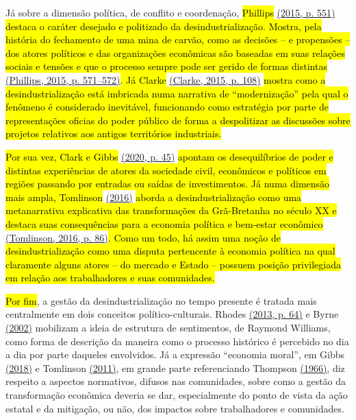 Já sobre a dimensão política, de conflito e coordenação, \hl{Phillips}
\href{https://www.zotero.org/google-docs/?7iYBD0}{(2015, p. 551)}
\hl{destaca o caráter desejado e politizado da desindustrialização.
Mostra, pela história do fechamento de uma mina de carvão, como as
decisões -- e propensões -- dos atores políticos e das organizações
econômicas são baseadas em suas relações sociais e tensões e que o
processo sempre pode ser gerido de formas distintas}
\href{https://www.zotero.org/google-docs/?T6n73h}{(Phillips, 2015, p.
571--572)}\hl{. Já Clarke}
\href{https://www.zotero.org/google-docs/?YgWzzI}{(Clarke, 2015, p.
108)} \hl{mostra como a desindustrialização está imbricada numa
narrativa de ``modernização'' pela qual o fenômeno é considerado
inevitável, funcionando como estratégia por parte de representações
oficias do poder público de forma a despolitizar as discussões sobre
projetos relativos aos antigos territórios industriais.}

\hl{Por sua vez, Clark e Gibbs}
\href{https://www.zotero.org/google-docs/?QpVkIs}{(2020, p. 45)}
\hl{apontam os desequilíbrios de poder e distintas experiências de
atores da sociedade civil, econômicos e políticos em regiões passando
por entradas ou saídas de investimentos. Já numa dimensão mais ampla,
Tomlinson} \href{https://www.zotero.org/google-docs/?FkA0zT}{(2016)}
\hl{aborda a desindustrialização como uma metanarrativa explicativa das
transformações da Grã-Bretanha no século XX e destaca suas consequências
para a economia política e bem-estar econômico}
\href{https://www.zotero.org/google-docs/?80xC3Z}{(Tomlinson, 2016, p.
86)}\hl{. Como um todo, há assim uma noção de desindustrialização como
uma disputa pertencente à economia política na qual claramente alguns
atores -- do mercado e Estado -- possuem posição privilegiada em relação
aos trabalhadores e suas comunidades.}

\hl{Por fim}, a gestão da desindustrialização no tempo presente é
tratada mais centralmente em dois conceitos político-culturais. Rhodes
\href{https://www.zotero.org/google-docs/?dYyfpM}{(2013, p. 64)} e Byrne
\href{https://www.zotero.org/google-docs/?izvyTn}{(2002)} mobilizam a
ideia de estrutura de sentimentos, de Raymond Williams, como forma de
descrição da maneira como o processo histórico é percebido no dia a dia
por parte daqueles envolvidos. Já a expressão ``economia moral'', em
Gibbs \href{https://www.zotero.org/google-docs/?7BP6gP}{(2018)} e
Tomlinson \href{https://www.zotero.org/google-docs/?ULOwso}{(2011)}, em
grande parte referenciando Thompson
\href{https://www.zotero.org/google-docs/?cOHBIG}{(1966)}, diz respeito
a aspectos normativos, difusos nas comunidades, sobre como a gestão da
transformação econômica deveria se dar, especialmente do ponto de vista
da ação estatal e da mitigação, ou não, dos impactos sobre trabalhadores
e comunidades.

